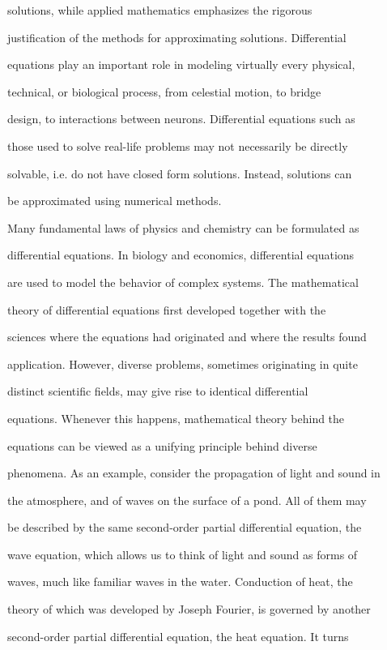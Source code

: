 solutions, while applied mathematics emphasizes the rigorous

justification of the methods for approximating solutions. Differential

equations play an important role in modeling virtually every physical,

technical, or biological process, from celestial motion, to bridge

design, to interactions between neurons. Differential equations such as

those used to solve real-life problems may not necessarily be directly

solvable, i.e. do not have closed form solutions. Instead, solutions can

be approximated using numerical methods.



Many fundamental laws of physics and chemistry can be formulated as

differential equations. In biology and economics, differential equations

are used to model the behavior of complex systems. The mathematical

theory of differential equations first developed together with the

sciences where the equations had originated and where the results found

application. However, diverse problems, sometimes originating in quite

distinct scientific fields, may give rise to identical differential

equations. Whenever this happens, mathematical theory behind the

equations can be viewed as a unifying principle behind diverse

phenomena. As an example, consider the propagation of light and sound in

the atmosphere, and of waves on the surface of a pond. All of them may

be described by the same second-order partial differential equation, the

wave equation, which allows us to think of light and sound as forms of

waves, much like familiar waves in the water. Conduction of heat, the

theory of which was developed by Joseph Fourier, is governed by another

second-order partial differential equation, the heat equation. It turns


